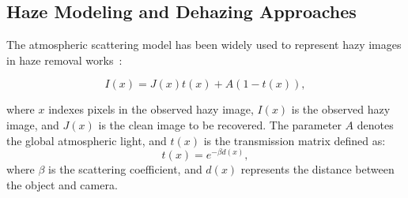 \documentclass[10pt,twocolumn,letterpaper]{article}
\begin{document}



\subsection{Haze Modeling and Dehazing Approaches}
The atmospheric scattering model has been widely used to represent hazy images in haze removal works~\cite{mccartney1976optics,narasimhan2000chromatic,narasimhan2002vision}:


\begin{equation}
\label{haze model definition}
I(x) = J(x)t(x) + A(1-t(x)),
\end{equation}

\noindent where $x$ indexes pixels in the observed hazy image, $I(x)$ is the observed hazy image, and $J(x)$ is the clean image to be recovered. The parameter $A$ denotes the global atmospheric light, and $t(x)$ is the transmission matrix defined as:
\begin{equation}
\label{trasmission matrix}
t(x) = e^{-\beta d(x)},
\end{equation}
\noindent where $\beta$ is the scattering coefficient, and $d(x)$ represents the distance between the object and camera.
\end{document}
